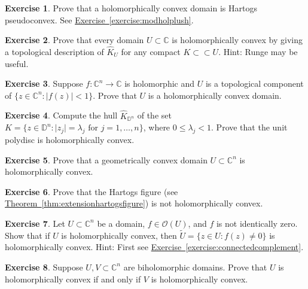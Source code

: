 \documentclass[12pt,openany]{book}
\newcommand{\sabs}[1]{\lvert {#1} \rvert}
\newcommand{\C}{{\mathbb{C}}}
\newcommand{\D}{{\mathbb{D}}}
\newcommand{\sO}{{\mathscr{O}}}
\theoremstyle{plain}
\theoremstyle{remark}
\theoremstyle{definition}
\newenvironment{exbox}{%
    \def\FrameCommand{\vrule width 1pt \relax\hspace{10pt}}%
    \MakeFramed {\advance \hsize -\width \FrameRestore}%
}{%
    \endMakeFramed
}
\theoremstyle{exercise}
\newtheorem{exercise}{Exercise}[section]
\theoremstyle{example}
\newcommand{\exerciseref}[1]{\hyperref[#1]{Exercise~\ref*{#1}}}
\newcommand{\thmref}[1]{\hyperref[#1]{Theorem~\ref*{#1}}}
\begin{document}
\begin{exbox}
\begin{exercise}
Prove that a holomorphically convex domain is Hartogs pseudoconvex.
See \exerciseref{exercise:modholplush}.
\end{exercise}

\begin{exercise}
Prove that every domain $U \subset \C$ is holomorphically convex by 
giving a topological description of $\widehat{K}_U$ for any
compact $K \subset \subset U$.  Hint: Runge may be useful.
\end{exercise}

\begin{exercise}
Suppose $f \colon \C^n \to \C$ is holomorphic and $U$ is a topological
component of $\bigl\{ z \in \C^n : \sabs{f(z)} < 1 \bigr\}$.  Prove
that $U$ is a holomorphically convex domain.
\end{exercise}

\begin{exercise}
Compute the hull
$\widehat{K}_{\D^n}$ of the set $K = \bigl\{ z \in \D^n : \sabs{z_j} =
\lambda_j \text{ for } j=1,\ldots,n \bigr\}$, where $0 \leq \lambda_j < 1$.
Prove that the unit polydisc is holomorphically convex.
\end{exercise}

\begin{exercise}
Prove that a geometrically convex domain $U \subset \C^n$
is holomorphically convex.
\end{exercise}

\begin{exercise}
Prove that the Hartogs figure (see \thmref{thm:extensionhartogsfigure})
is not holomorphically convex.
\end{exercise}

\begin{exercise}
Let $U \subset \C^n$ be a domain, $f \in \sO(U)$, and $f$ is not identically
zero.  Show that if
$U$ is holomorphically convex, then
$\widetilde{U} = \bigl\{ z \in U : f(z) \not= 0 \bigr\}$
is holomorphically convex.  
Hint: First see \exerciseref{exercise:connectedcomplement}.
\end{exercise}

\begin{exercise} \label{exercise:biholholconvex}
Suppose $U,V \subset \C^n$ are biholomorphic domains.
Prove that $U$ is holomorphically convex if and only if $V$ is
holomorphically convex.
\end{exercise}


\end{exbox}
\end{document}
